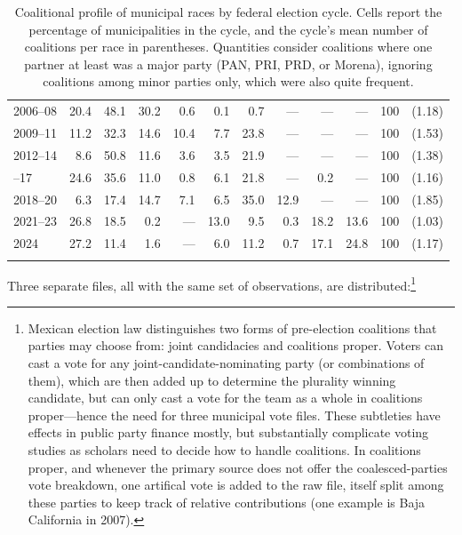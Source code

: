 \documentclass[letter,12pt]{article}
\begin{document}
\begin{table}
{\begin{tabular}{lrrrrrrrrrrc}
 2006--08&  20.4&  48.1&   30.2&    0.6&    0.1&       0.7&         ---&  ---&       ---& 100 & (1.18) \\
 2009--11&  11.2&  32.3&   14.6&   10.4&    7.7&      23.8&         ---&  ---&       ---& 100 & (1.53) \\
 2012--14&   8.6&  50.8&   11.6&    3.6&    3.5&      21.9&         ---&  ---&       ---& 100 & (1.38) \\ \hdashline
 2015--17&  24.6&  35.6&   11.0&    0.8&    6.1&      21.8&         ---&  0.2&       ---& 100 & (1.16) \\
 2018--20&   6.3&  17.4&   14.7&    7.1&    6.5&      35.0&        12.9&  ---&       ---& 100 & (1.85) \\
 2021--23&  26.8&  18.5&    0.2&    ---&   13.0&       9.5&         0.3& 18.2&      13.6& 100 & (1.03) \\
 2024    &  27.2&  11.4&    1.6&    ---&    6.0&      11.2&         0.7& 17.1&      24.8& 100 & (1.17) \\ 
     &      &      &       &       &       &          &            &     &          &       &        \\ [-1.8ex] 
  \hline
\end{tabular}
}
\caption{Coalitional profile of municipal races by federal election cycle. Cells report the percentage of municipalities in the cycle, and the cycle's mean number of coalitions per race in parentheses. Quantities consider coalitions where one partner at least was a major party (PAN, PRI, PRD, or Morena), ignoring coalitions among minor parties only, which were also quite frequent.}\label{T:coal}
\end{table}

Three separate files, all with the same set of observations, are distributed:\footnote{Mexican election law distinguishes two forms of pre-election coalitions that parties may choose from: joint candidacies and coalitions proper. Voters can cast a vote for any joint-candidate-nominating party (or combinations of them), which are then added up to determine the plurality winning candidate, but can only cast a vote for the team as a whole in coalitions proper---hence the need for three municipal vote files. These subtleties have effects in public party finance mostly, but substantially complicate voting studies as scholars need to decide how to handle coalitions. In coalitions proper, and whenever the primary source does not offer the coalesced-parties vote breakdown, one artifical vote is added to the raw file, itself split among these parties to keep track of relative contributions (one example is Baja California in 2007).\label{fn:trio}}
\end{document}
